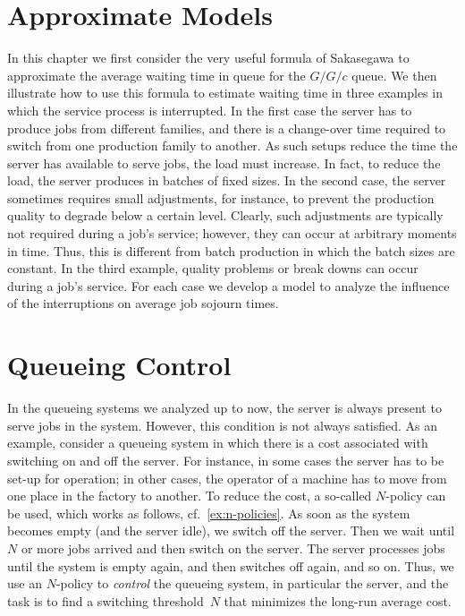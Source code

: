 \chapter{Approximate Models}
\label{cha:approximate-models}
In this chapter we first consider the very useful formula of Sakasegawa to approximate the average waiting time in queue for the $G/G/c$ queue.
We then illustrate how to use this formula to estimate waiting time in three examples in which the service process is interrupted.
In the first case the server has to produce jobs from different families, and there is a change-over time required to switch from one production family to another.
As such setups reduce the time the server has available to serve jobs, the load must increase.
In fact, to reduce the load, the server produces in batches of fixed sizes.
In the second case, the server sometimes requires small adjustments, for instance, to prevent the production quality to degrade below a certain level.
Clearly, such adjustments are typically not required during a job's service; however, they can occur at arbitrary moments in time.
Thus, this is different from batch production in which the batch sizes are constant.
In the third example, quality problems or break downs can occur during a job's service.
For each case we develop a model to analyze the influence of the interruptions on average job sojourn times.






%


\chapter{Queueing Control}

In the queueing systems we analyzed up to now, the server is always present to serve jobs in the system. However, this condition is not always satisfied.
As an example, consider a queueing system in which there is a cost associated with switching on and off the server.
For instance, in some cases the server has to be set-up for operation; in other cases, the operator of a machine has to move from one place in the factory to another.
To reduce the cost, a so-called $N$-policy can be used, which works as follows, cf.~\cref{ex:n-policies}.
As soon as the system becomes empty (and the server idle), we switch off the server.
Then we wait until $N$ or more jobs arrived and then switch on the server.
The server processes jobs until the system is empty again, and then switches off again, and so on.
Thus, we use an $N$-policy to \emph{control} the queueing system, in particular the server, and the task is to find a switching threshold~$N$ that minimizes the long-run average cost.

